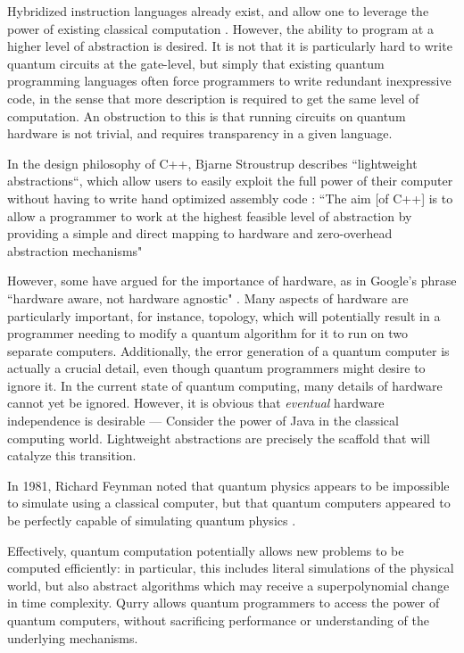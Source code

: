 \documentclass[a4paper,twocolumn,11pt,accepted=2017-05-09]{quantumarticle}
\begin{document}
Hybridized instruction languages already exist, and allow one to leverage the power of existing classical computation \cite{forest, cirq, qasm, pyquil}.
However, the ability to program at a higher level of abstraction is desired.
It is not that it is particularly hard to write quantum circuits at the gate-level, but simply that existing quantum programming languages often force programmers to write redundant inexpressive code, in the sense that more description is required to get the same level of computation.
An obstruction to this is that running circuits on quantum hardware is not trivial, and requires transparency in a given language.

In the design philosophy of C++, Bjarne Stroustrup describes ``lightweight abstractions“, which allow users to easily exploit the full power of their computer without having to write hand optimized assembly code \cite{stroustrup}:
``The aim [of C++] is to allow a programmer to work at the highest feasible level of abstraction by providing a simple and direct mapping to hardware and zero-overhead abstraction mechanisms"

However, some have argued for the importance of hardware, as in Google's phrase ``hardware aware, not hardware agnostic" \cite{google_cloud}.
Many aspects of hardware are particularly important, for instance, topology, which will potentially result in a programmer needing to modify a quantum algorithm for it to run on two separate computers.
Additionally, the error generation of a quantum computer is actually a crucial detail, even though quantum programmers might desire to ignore it.
In the current state of quantum computing, many details of hardware cannot yet be ignored. 
However, it is obvious that \emph{eventual} hardware independence is desirable --- Consider the power of Java in the classical computing world. Lightweight abstractions are precisely the scaffold that will catalyze this transition.

In 1981, Richard Feynman noted that quantum physics appears to be impossible to simulate using a classical computer, but that quantum computers appeared to be perfectly capable of simulating quantum physics \cite{feynman_1981}.

Effectively, quantum computation potentially allows new problems to be computed efficiently: in particular, this includes literal simulations of the physical world, but also abstract algorithms which may receive a superpolynomial change in time complexity.
Qurry allows quantum programmers to access the power of quantum computers, without sacrificing performance or understanding of the underlying mechanisms.
\cite{nc}
\end{document}
